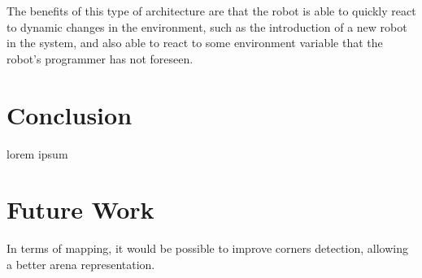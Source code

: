 \documentclass[oribibl]{llncs}
\begin{document}
The benefits of this type of architecture are that the robot is able to quickly react to dynamic changes in the environment, such as the introduction of a new robot in the system, and also able to react to some environment variable that the robot's programmer has not foreseen.

\section{Conclusion}
lorem ipsum

\section{Future Work}
In terms of mapping, it would be possible to improve corners detection, allowing a better arena representation.



\end{document}
